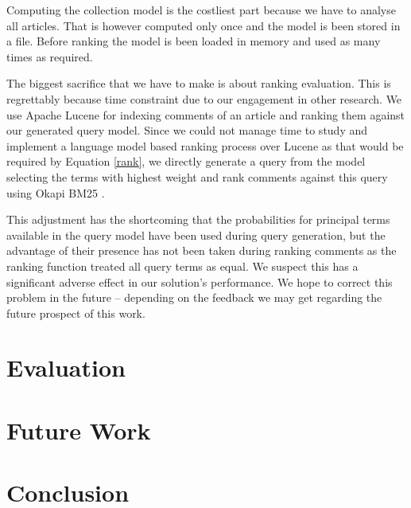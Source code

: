 \documentclass[article]{IEEEtran}
\begin{document}
Computing the collection model is the costliest part because we have to analyse all articles. That is however computed only once and the model is been stored in a file. Before ranking the model is been loaded in memory and used as many times as required.

The biggest sacrifice that we have to make is about ranking evaluation. This is regrettably because time constraint due to our engagement in other research. We use Apache Lucene \cite{McCandless:2010:LAS:1893016} for indexing comments of an article and ranking them against our generated query model. Since we could not manage time to study and implement a language model based ranking process over Lucene as that would be required by Equation \ref{rank}, we directly generate a query from the model selecting the terms with highest weight and rank comments against this query using Okapi BM25 \cite{Robertson96okapiat}.

This adjustment has the shortcoming that the probabilities for principal terms available in the query model have been used during query generation, but the advantage of their presence has not been taken during ranking comments as the ranking function treated all query terms as equal. We suspect this has a significant adverse effect in our solution's performance. We hope to correct this problem in the future -- depending on the feedback we may get regarding the future prospect of this work.          

\section{Evaluation}
\label{ev}

\section{Future Work}
\label{fw}
 
\section{Conclusion}
\label{con}

\nocite{titov2008modeling, ma2012topic, das2014going, blei2003modeling}

 
\end{document}
